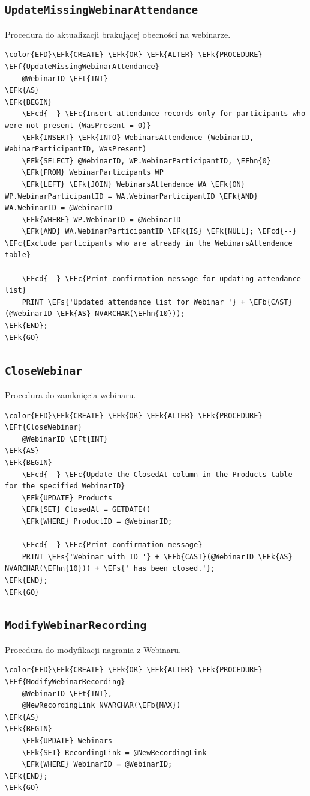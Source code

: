 \documentclass[11pt]{article}
\newcommand{\EFc}[1]{\textcolor{EFc}{\textit{#1}}} %
\newcommand{\EFcd}[1]{\textcolor{EFcd}{\textit{#1}}} %
\newcommand{\EFs}[1]{\textcolor{EFs}{#1}} %
\newcommand{\EFk}[1]{\textcolor{EFk}{\textbf{#1}}} %
\newcommand{\EFb}[1]{\textcolor{EFb}{\textbf{#1}}} %
\newcommand{\EFf}[1]{\textcolor{EFf}{#1}} %
\newcommand{\EFt}[1]{\textcolor{EFt}{\textbf{#1}}} %
\newcommand{\EFhn}[1]{\textcolor{EFhn}{#1}} %
\begin{document}
\subsection{\texttt{UpdateMissingWebinarAttendance}}
\label{sec:org8986d6f}
Procedura do aktualizacji brakującej obecności na webinarze.
\begin{Code}
\begin{Verbatim}
\color{EFD}\EFk{CREATE} \EFk{OR} \EFk{ALTER} \EFk{PROCEDURE} \EFf{UpdateMissingWebinarAttendance}
    @WebinarID \EFt{INT}
\EFk{AS}
\EFk{BEGIN}
    \EFcd{--} \EFc{Insert attendance records only for participants who were not present (WasPresent = 0)}
    \EFk{INSERT} \EFk{INTO} WebinarsAttendence (WebinarID, WebinarParticipantID, WasPresent)
    \EFk{SELECT} @WebinarID, WP.WebinarParticipantID, \EFhn{0}
    \EFk{FROM} WebinarParticipants WP
    \EFk{LEFT} \EFk{JOIN} WebinarsAttendence WA \EFk{ON} WP.WebinarParticipantID = WA.WebinarParticipantID \EFk{AND} WA.WebinarID = @WebinarID
    \EFk{WHERE} WP.WebinarID = @WebinarID
    \EFk{AND} WA.WebinarParticipantID \EFk{IS} \EFk{NULL}; \EFcd{--} \EFc{Exclude participants who are already in the WebinarsAttendence table}

    \EFcd{--} \EFc{Print confirmation message for updating attendance list}
    PRINT \EFs{'Updated attendance list for Webinar '} + \EFb{CAST}(@WebinarID \EFk{AS} NVARCHAR(\EFhn{10}));
\EFk{END};
\EFk{GO}
\end{Verbatim}
\end{Code}
\subsection{\texttt{CloseWebinar}}
\label{sec:org47fa2a7}
Procedura do zamknięcia webinaru.
\begin{Code}
\begin{Verbatim}
\color{EFD}\EFk{CREATE} \EFk{OR} \EFk{ALTER} \EFk{PROCEDURE} \EFf{CloseWebinar}
    @WebinarID \EFt{INT}
\EFk{AS}
\EFk{BEGIN}
    \EFcd{--} \EFc{Update the ClosedAt column in the Products table for the specified WebinarID}
    \EFk{UPDATE} Products
    \EFk{SET} ClosedAt = GETDATE()
    \EFk{WHERE} ProductID = @WebinarID;

    \EFcd{--} \EFc{Print confirmation message}
    PRINT \EFs{'Webinar with ID '} + \EFb{CAST}(@WebinarID \EFk{AS} NVARCHAR(\EFhn{10})) + \EFs{' has been closed.'};
\EFk{END};
\EFk{GO}
\end{Verbatim}
\end{Code}
\subsection{\texttt{ModifyWebinarRecording}}
\label{sec:org6cb3914}
Procedura do modyfikacji nagrania z Webinaru.
\begin{Code}
\begin{Verbatim}
\color{EFD}\EFk{CREATE} \EFk{OR} \EFk{ALTER} \EFk{PROCEDURE} \EFf{ModifyWebinarRecording}
    @WebinarID \EFt{INT},
    @NewRecordingLink NVARCHAR(\EFb{MAX})
\EFk{AS}
\EFk{BEGIN}
    \EFk{UPDATE} Webinars
    \EFk{SET} RecordingLink = @NewRecordingLink
    \EFk{WHERE} WebinarID = @WebinarID;
\EFk{END};
\EFk{GO}
\end{Verbatim}
\end{Code}
\end{document}
